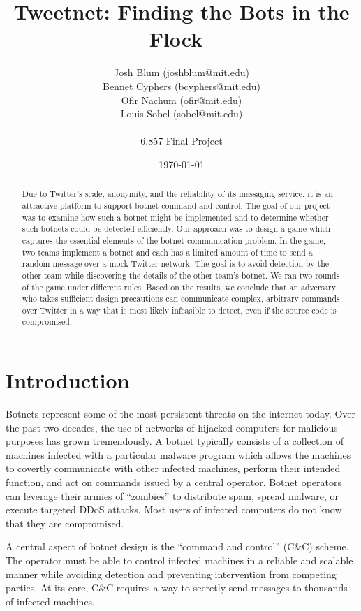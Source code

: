 \documentclass[11pt, oneside]{article} %
\title{ 
Tweetnet: Finding the Bots in the Flock\
}
\author{
Josh Blum (joshblum@mit.edu)\\
Bennet Cyphers (bcyphers@mit.edu)\\
Ofir Nachum (ofir@mit.edu)\\
Louis Sobel (sobel@mit.edu)\\
\\
6.857 Final Project
\date{\today}
}
\numberwithin{equation}{section} %
\numberwithin{figure}{section} %
\numberwithin{table}{section} %
\begin{document}
\maketitle

\vspace{4em}

\begin{abstract}
    Due to Twitter's scale, anonymity, and the reliability of its messaging service, it is an attractive platform to support botnet command and control. The goal of our project was to examine how such a botnet might be implemented and to determine whether such botnets could be detected efficiently. Our approach was to design a game which captures the essential elements of the botnet communication problem. In the game, two teams implement a botnet and each has a limited amount of time to send a random message over a mock Twitter network. The goal is to avoid detection by the other team while discovering the details of the other team's botnet. We ran two rounds of the game under different rules. Based on the results, we conclude that an adversary who takes sufficient design precautions can communicate complex, arbitrary commands over Twitter in a way that is most likely infeasible to detect, even if the source code is compromised.
\end{abstract}

\clearpage

\section {Introduction}
Botnets represent some of the most persistent threats on the internet today. Over the past two decades, the use of networks of hijacked computers for malicious purposes has grown tremendously. A botnet typically consists of a collection of machines infected with a particular malware program which allows the machines to covertly communicate with other infected machines, perform their intended function, and act on commands issued by a central operator. Botnet operators can leverage their armies of ``zombies'' to distribute spam, spread malware, or execute targeted DDoS attacks. Most users of infected computers do not know that they are compromised.

A central aspect of botnet design is the ``command and control'' (C\&C) scheme. The operator must be able to control infected machines in a reliable and scalable manner while avoiding detection and preventing intervention from competing parties. At its core, C\&C requires a way to secretly send messages to thousands of infected machines.
\end{document}
